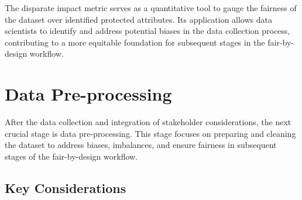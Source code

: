 The disparate impact metric serves as a quantitative tool to gauge the fairness of the dataset over identified protected attributes. Its application allows data scientists to identify and address potential biases in the data collection process, contributing to a more equitable foundation for subsequent stages in the fair-by-design workflow.

\section{Data Pre-processing}
\label{section:pre-proc}

After the data collection and integration of stakeholder considerations, the next crucial stage is data pre-processing. This stage focuses on preparing and cleaning the dataset to address biases, imbalances, and ensure fairness in subsequent stages of the fair-by-design workflow.

\subsection{Key Considerations}

